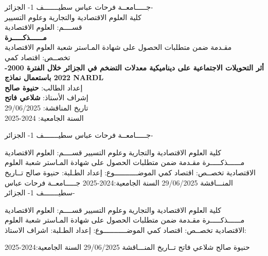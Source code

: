 \documentclass[12pt,a4paper]{report}
\begin{document}
\begin{titlepage}
\centering
{\Large جـــــامعــة فرحات عباس سطيـــــــف 1- الجزائر-\\
كلية العلوم الاقتصادية والتجارية وعلوم التسيير\\
قســــم: العلوم الاقتصادية}\\[2cm]

{\Huge \textbf{مــــــذكـــــرة}}\\[0.5cm]

{\large مقـدمة ضمن متطلبات الحصول على شهادة المـاستر شعبة العلوم الاقتصادية\\
تخصــص: اقتصاد كمي}\\[2cm]

{\LARGE \textbf{أثر التحويلات الاجتماعية على ديناميكية معدلات التضخم في الجزائر خلال الفترة 2000-2022 باستعمال نماذج NARDL}}\\[2cm]

{\Large إعداد الطالب: \textbf{حنيوة صالح}}\\[0.5cm]
{\Large إشراف الأستاذ: \textbf{شلاعي فاتح}}\\[2cm]

{\Large تاريخ المناقشة: 29/06/2025}\\
{\Large السنة الجامعية: 2024-2025}
\end{titlepage}

\tableofcontents
\newpage

   جـــــامعــة فرحات عباس سطيـــــــف 1- الجزائر-

كلية العلوم الاقتصادية والتجارية وعلوم التسيير  
قســــم: العلوم الاقتصادية
          مــــــذكـــــرة
مقـدمة ضمن متطلبات الحصول على شهادة المـاستر شعبة العلوم الاقتصادية
تخصــص: اقتصاد كمي
الموضـــــــــــوع:
إعداد الطـلبة:      
 حنيوة صالح                                                                              
تــاريخ المنـــاقشة 29/06/2025
السنة الجامعية:2024-2025
جـــــامعــة فرحات عباس سطيـــــــف 1- الجزائر-

كلية العلوم الاقتصادية والتجارية وعلوم التسيير
قســــم: العلوم الاقتصادية
          مــــــذكـــــرة
مقـدمة ضمن متطلبات الحصول على شهادة المـاستر شعبة العلوم الاقتصادية
تخصــص: اقتصاد كمي
الموضـــــــــــوع:
إعداد الطـلبة:                                                                                              اشراف الاستاذ:











 حنيوة صالح                                                                                               شلاعي فاتح                                  
تــاريخ المنـــاقشة 29/06/2025
السنة الجامعية:2024-2025
\end{document}
